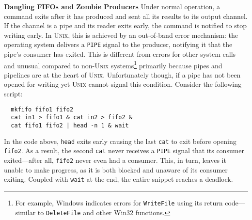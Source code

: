 \documentclass[sigplan, review, screen, anonymous]{acmart}
\newcommand{\heading}[1]{\vspace{4pt}\noindent\textbf{#1}\enspace}
\newcommand{\ttt}[1]{\texttt{#1}}
\newcommand{\TODO}[1]{\hl{\textbf{TODO:} #1}\xspace}
\newcommand{\nv}[1]{[{\color{cyan}nv: #1}]}
\newcommand{\kk}[1]{[{\color{magenta}kk: #1}]}
\newcommand{\sys}{{\scshape PaSh}\xspace}
\newcommand{\unix}{{\scshape Unix}\xspace}
\begin{document}
\heading{Dangling FIFOs and Zombie Producers}
%
%
Under normal operation, a command exits after it has produced and sent all its results to its output channel.
If the channel is a pipe and its reader exits early, the command is notified to stop writing early.
In \unix, this is achieved by an out-of-band error mechanism: the
operating system delivers a \ttt{PIPE} signal to the producer,
notifying it that the pipe's consumer has exited.  This is different
from errors for other system calls
and unusual compared to non-\unix systems\footnote{For example,
  Windows indicates errors for \ttt{WriteFile} using its return
  code---similar to \ttt{DeleteFile} and other Win32 functions.}
primarily because pipes and pipelines are at the heart of \unix.
Unfortunately though, if a pipe has not been opened for writing yet
  \unix cannot signal this condition.
Consider the following script:
\begin{verbatim}
  mkfifo fifo1 fifo2
  cat in1 > fifo1 & cat in2 > fifo2 &
  cat fifo1 fifo2 | head -n 1 & wait
\end{verbatim}
\noindent
In the code above, \ttt{head} exits early causing the last \ttt{cat} to exit before opening \ttt{fifo2}.
As a result, the second \ttt{cat} never receives a \ttt{PIPE} signal that its consumer exited---after all, \ttt{fifo2} never even had a consumer.
This, in turn, leaves it unable to make progress, as it is both blocked and unaware of its consumer exiting.
Coupled with \ttt{wait} at the end, the entire snippet reaches a deadlock.
\end{document}
